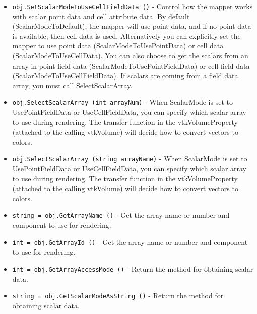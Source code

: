 \begin{itemize}
\item  \verb|obj.SetScalarModeToUseCellFieldData ()| -  Control how the mapper works with scalar point data and cell attribute
 data.  By default (ScalarModeToDefault), the mapper will use point data,
 and if no point data is available, then cell data is used. Alternatively
 you can explicitly set the mapper to use point data
 (ScalarModeToUsePointData) or cell data (ScalarModeToUseCellData).
 You can also choose to get the scalars from an array in point field
 data (ScalarModeToUsePointFieldData) or cell field data
 (ScalarModeToUseCellFieldData).  If scalars are coming from a field
 data array, you must call SelectScalarArray.

\item  \verb|obj.SelectScalarArray (int arrayNum)| -  When ScalarMode is set to UsePointFieldData or UseCellFieldData,
 you can specify which scalar array to use during rendering.
 The transfer function in the vtkVolumeProperty (attached to the calling
 vtkVolume) will decide how to convert vectors to colors.

\item  \verb|obj.SelectScalarArray (string arrayName)| -  When ScalarMode is set to UsePointFieldData or UseCellFieldData,
 you can specify which scalar array to use during rendering.
 The transfer function in the vtkVolumeProperty (attached to the calling
 vtkVolume) will decide how to convert vectors to colors.

\item  \verb|string = obj.GetArrayName ()| -  Get the array name or number and component to use for rendering.

\item  \verb|int = obj.GetArrayId ()| -  Get the array name or number and component to use for rendering.

\item  \verb|int = obj.GetArrayAccessMode ()| -  Return the method for obtaining scalar data.

\item  \verb|string = obj.GetScalarModeAsString ()| -  Return the method for obtaining scalar data.

\end{itemize}
